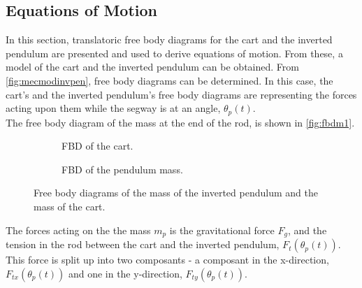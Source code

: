 \subsection{Equations of Motion}
In this section, translatoric free body diagrams for the cart and the inverted pendulum are presented and used to derive equations of motion. From these, a model of the cart and the inverted pendulum can be obtained.
\newpar
From \autoref{fig:mecmodinvpen}, free body diagrams can be determined. In this case, the cart's and the inverted pendulum's free body diagrams are representing the forces acting upon them while the segway is at an angle, $\theta_p(t)$.\\
The free body diagram of the mass at the end of the rod, is shown in \autoref{fig:fbdm1}.
\begin{figure}[H]
\centering
\begin{subfigure}[b]{0.42\textwidth}
		\hspace{1.5cm}
        \scalebox{0.6}{}
		\caption{FBD of the cart.}
		\label{fig:fbdm2}
\end{subfigure}
\hspace{1 cm}
\begin{subfigure}[b]{0.42\textwidth}
		\centering
        \scalebox{0.6}{}
		\caption{FBD of the pendulum mass.}
		\label{fig:fbdm1}
    \end{subfigure}  
\caption{Free body diagrams of the mass of the inverted pendulum and the mass of the cart.}
\label{fig:FBDMotorWheel}
\end{figure}
\clearpage
The forces acting on the the mass $m_p$ is the gravitational force $F_g$, and the tension in the rod between the cart and the inverted pendulum, $F_t(\theta_p(t))$. This force is split up into two composants - a composant in the x-direction, $F_{tx}(\theta_p(t))$ and one in the y-direction, $F_{ty}(\theta_p(t))$. %
